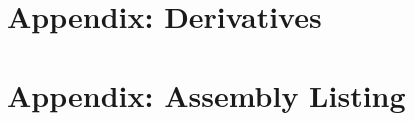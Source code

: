 \documentclass[cup9a]{cupbook}
\begin{document}

    
    \label{part:appendix}
    \chapter{Appendix: Derivatives}
     
    \chapter{Appendix: Assembly Listing}
    
\end{document}

